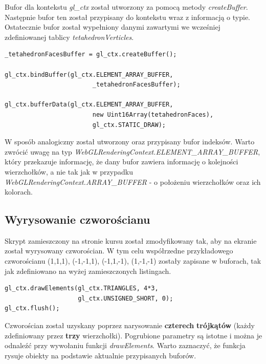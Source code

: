\documentclass[a4paper,11pt]{article}
\begin{document}
Bufor dla kontekstu \textit{gl_ctx} został utworzony za pomocą metody \textit{createBuffer}. Następnie bufor ten został przypisany do kontekstu wraz z informacją o typie. Ostatecznie bufor został wypełniony danymi zawartymi we wcześniej zdefiniowanej tablicy \textit{tetahedronVerticles}.

\newpage
\begin{lstlisting}[caption=Utworzenie oraz przypięcie bufora indeksów]
_tetahedronFacesBuffer = gl_ctx.createBuffer();

gl_ctx.bindBuffer(gl_ctx.ELEMENT_ARRAY_BUFFER, 
				   		_tetahedronFacesBuffer);

gl_ctx.bufferData(gl_ctx.ELEMENT_ARRAY_BUFFER,
				   		new Uint16Array(tetahedronFaces),
				   		gl_ctx.STATIC_DRAW);
\end{lstlisting}

W sposób analogiczny został utworzony oraz przypisany bufor indeksów. Warto zwrócić uwagę na typ \textit{WebGLRenderingContext.ELEMENT_ARRAY_BUFFER}, który przekazuje informację, że dany bufor zawiera informację o kolejności wierzchołków, a nie tak jak w przypadku \textit{WebGLRenderingContext.ARRAY_BUFFER} - o położeniu wierzchołków oraz ich kolorach.

\subsection{Wyrysowanie czworościanu}

Skrypt zamieszczony na stronie kursu został zmodyfikowany tak, aby na ekranie został wyrysowany czworościan. W tym celu współrzedne przykładowego czworościanu (1,1,1), (-1,-1,1), (-1,1,-1), (1,-1,-1) zostały zapisane w buforach, tak jak zdefiniowano na wyżej zamieszczonych listingach.

\begin{lstlisting}[caption=Wyrysowanie elemetów zawartych w buforach]
gl_ctx.drawElements(gl_ctx.TRIANGLES, 4*3, 
					gl_ctx.UNSIGNED_SHORT, 0);
gl_ctx.flush();
\end{lstlisting}

Czworościan został uzyskany poprzez narysowanie \textbf{czterech} \textbf{trójkątów} (każdy zdefiniowany przez \textbf{trzy} wierzchołki). Pogrubione parametry są istotne i można je odnaleźć przy wywołaniu funkcji \textit{drawElements}. Warto zaznaczyć, że funkcja rysuje obiekty na podstawie aktualnie przypisanych buforów.
\end{document}
